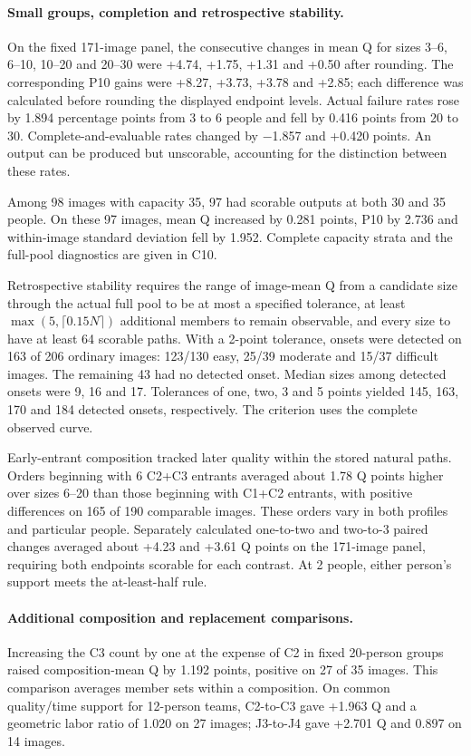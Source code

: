 \paragraph{Small groups, completion and retrospective stability.}
On the fixed 171-image panel, the consecutive changes in mean Q for sizes 3--6, 6--10, 10--20 and 20--30 were +4.74, +1.75, +1.31 and +0.50 after rounding. The corresponding P10 gains were +8.27, +3.73, +3.78 and +2.85; each difference was calculated before rounding the displayed endpoint levels. Actual failure rates rose by 1.894 percentage points from 3 to 6 people and fell by 0.416 points from 20 to 30. Complete-and-evaluable rates changed by $-$1.857 and +0.420 points. An output can be produced but unscorable, accounting for the distinction between these rates.

Among 98 images with capacity 35, 97 had scorable outputs at both 30 and 35 people. On these 97 images, mean Q increased by 0.281 points, P10 by 2.736 and within-image standard deviation fell by 1.952. Complete capacity strata and the full-pool diagnostics are given in C10.

Retrospective stability requires the range of image-mean Q from a candidate size through the actual full pool to be at most a specified tolerance, at least $\max(5,\lceil0.15N\rceil)$ additional members to remain observable, and every size to have at least 64 scorable paths. With a 2-point tolerance, onsets were detected on 163 of 206 ordinary images: 123/130 easy, 25/39 moderate and 15/37 difficult images. The remaining 43 had no detected onset. Median sizes among detected onsets were 9, 16 and 17. Tolerances of one, two, 3 and 5 points yielded 145, 163, 170 and 184 detected onsets, respectively. The criterion uses the complete observed curve.

Early-entrant composition tracked later quality within the stored natural paths. Orders beginning with 6 C2+C3 entrants averaged about 1.78 Q points higher over sizes 6--20 than those beginning with C1+C2 entrants, with positive differences on 165 of 190 comparable images. These orders vary in both profiles and particular people. Separately calculated one-to-two and two-to-3 paired changes averaged about +4.23 and +3.61 Q points on the 171-image panel, requiring both endpoints scorable for each contrast. At 2 people, either person's support meets the at-least-half rule.

\paragraph{Additional composition and replacement comparisons.}
Increasing the C3 count by one at the expense of C2 in fixed 20-person groups raised composition-mean Q by 1.192 points, positive on 27 of 35 images. This comparison averages member sets within a composition. On common quality/time support for 12-person teams, C2-to-C3 gave +1.963 Q and a geometric labor ratio of 1.020 on 27 images; J3-to-J4 gave +2.701 Q and 0.897 on 14 images.

